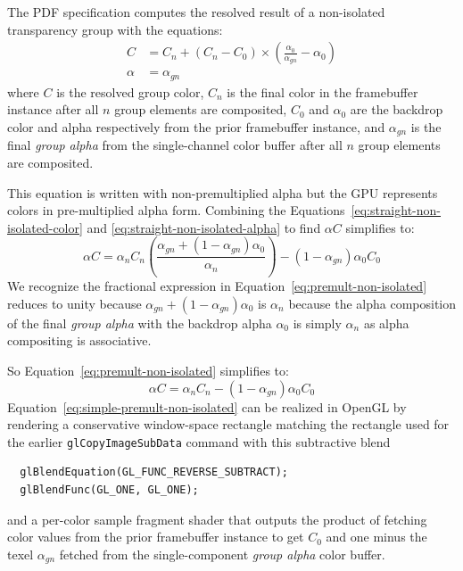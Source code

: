 The PDF specification computes the resolved result of a non-isolated transparency group with the equations:
\begin{align}
\label{eq:straight-non-isolated-color}
C & = C_n + (C_{n} - C_{0}) \times \left( \frac{\alpha_{0}}{\alpha_{gn}} - \alpha_{0} \right) \\
%
\label{eq:straight-non-isolated-alpha}
\alpha & = \alpha_{gn}
\end{align}
where $C$ is the resolved group color, $C_{n}$ is the final color in the framebuffer instance after all $n$ group
elements are composited, $C_{0}$ and $\alpha_{0}$ are the backdrop color and alpha respectively
from the prior framebuffer instance, and $\alpha_{gn}$ is the final {\em group alpha} from the
single-channel color buffer after all $n$ group elements are composited.

This equation is written with non-premultiplied alpha but the GPU represents colors in pre-multiplied alpha form.
Combining the Equations~\ref{eq:straight-non-isolated-color} and \ref{eq:straight-non-isolated-alpha} to find $\alpha C$ simplifies to:
\begin{equation}
\label{eq:premult-non-isolated}
\alpha C = \alpha_{n} C_{n} \left( \frac{\alpha_{gn} + (1-\alpha_{gn}) \alpha_{0}}{\alpha_{n}} \right) - (1-\alpha_{gn}) \alpha_{0} C_{0}
\end{equation}
We recognize the fractional expression in Equation~\ref{eq:premult-non-isolated} reduces to unity
because  $\alpha_{gn} + (1-\alpha_{gn}) \alpha_{0}$ is $\alpha_{n}$ because 
the alpha composition of the final {\em group alpha} with the backdrop alpha $\alpha_{0}$ is simply $\alpha_{n}$
as alpha compositing is associative.

So Equation~\ref{eq:premult-non-isolated} simplifies to:
\begin{equation}
\label{eq:simple-premult-non-isolated}
\alpha C = \alpha_{n} C_{n} - (1-\alpha_{gn}) \alpha_{0} C_{0}
\end{equation}
Equation~\ref{eq:simple-premult-non-isolated} can be realized in OpenGL by rendering a conservative window-space rectangle
matching the rectangle used for the earlier {\tt glCopyImageSubData} command with this subtractive blend
\begin{verbatim}
  glBlendEquation(GL_FUNC_REVERSE_SUBTRACT);
  glBlendFunc(GL_ONE, GL_ONE);
\end{verbatim}
and a per-color sample fragment shader that outputs the product of fetching color values from the prior framebuffer
instance to get $C_{0}$ and one minus the texel $\alpha_{gn}$ fetched from the single-component {\em group
alpha} color buffer.

